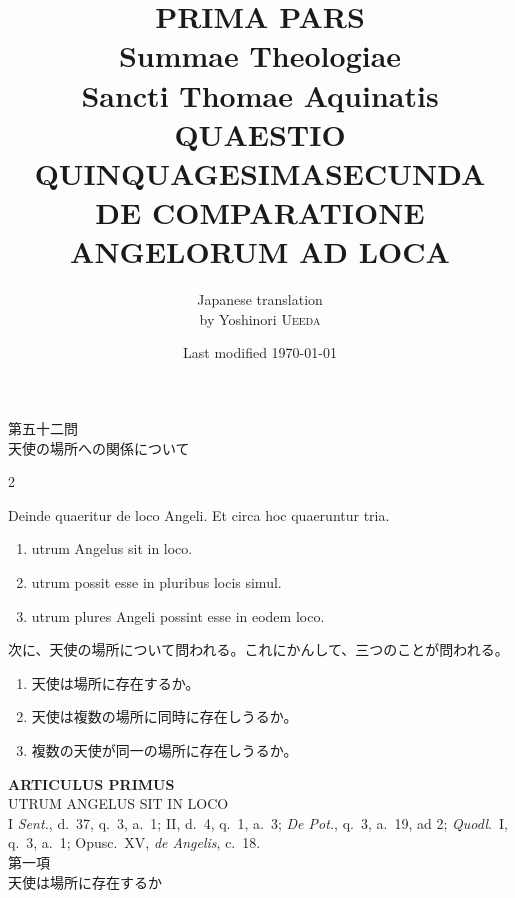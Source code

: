 \documentclass[paper=a4paper,fontsize=10pt,jafontsize=9pt,titlepage]{jlreq}
\title{{\bfseries PRIMA PARS}\\{\Huge Summae Theologiae}\\Sancti Thomae
Aquinatis\\{\sffamily QUAESTIO QUINQUAGESIMASECUNDA}\\DE COMPARATIONE ANGELORUM AD LOCA}
\author{Japanese translation\\by Yoshinori {\scshape Ueeda}}
\date{Last modified \today}
\begin{document}
\maketitle
\pagestyle{fancy}

\begin{center}
{\Large 第五十二問\\天使の場所への関係について}
\end{center}

\begin{paracol}{2}

Deinde quaeritur de loco Angeli. Et circa hoc quaeruntur tria. 
\begin{enumerate}
 \item utrum Angelus sit in loco.
 \item utrum possit esse in pluribus locis simul.
 \item utrum plures Angeli possint esse in eodem loco.
\end{enumerate}

\switchcolumn

次に、天使の場所について問われる。これにかんして、三つのことが問われる。
\begin{enumerate}
 \item 天使は場所に存在するか。
 \item 天使は複数の場所に同時に存在しうるか。
 \item 複数の天使が同一の場所に存在しうるか。
\end{enumerate}

\end{paracol}

\newpage
{}
{}
\setcounter{section}{1}
\setcounter{subsection}{0}



\begin{center}
 {\Large {\bfseries ARTICULUS PRIMUS}}\\
 {\large UTRUM ANGELUS SIT IN LOCO}\\
 {\footnotesize I {\itshape Sent.}, d.~37, q.~3, a.~1; II, d.~4, q.~1, a.~3; {\itshape De Pot.}, q.~3, a.~19, ad 2; {\itshape Quodl}.~I, q.~3, a.~1; Opusc.~XV, {\itshape de Angelis}, c.~18.}\\
 {\Large 第一項\\天使は場所に存在するか}
\end{center}
\end{document}
